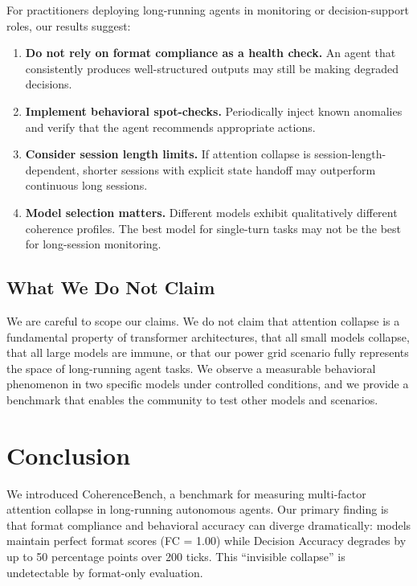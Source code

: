 \documentclass{article}
\begin{document}
For practitioners deploying long-running agents in monitoring or
decision-support roles, our results suggest:

\begin{enumerate}
    \item \textbf{Do not rely on format compliance as a health check.}
    An agent that consistently produces well-structured outputs may
    still be making degraded decisions.
    \item \textbf{Implement behavioral spot-checks.} Periodically inject
    known anomalies and verify that the agent recommends appropriate
    actions.
    \item \textbf{Consider session length limits.} If attention collapse
    is session-length-dependent, shorter sessions with explicit state
    handoff may outperform continuous long sessions.
    \item \textbf{Model selection matters.} Different models exhibit
    qualitatively different coherence profiles. The best model for
    single-turn tasks may not be the best for long-session monitoring.
\end{enumerate}

\subsection{What We Do Not Claim}

We are careful to scope our claims. We do not claim that attention
collapse is a fundamental property of transformer architectures, that
all small models collapse, that all large models are immune, or that our
power grid scenario fully represents the space of long-running agent
tasks. We observe a measurable behavioral phenomenon in two specific
models under controlled conditions, and we provide a benchmark that
enables the community to test other models and scenarios.

\section{Conclusion}
\label{sec:conclusion}

We introduced CoherenceBench, a benchmark for measuring multi-factor
attention collapse in long-running autonomous agents. Our primary finding
is that format compliance and behavioral accuracy can diverge
dramatically: models maintain perfect format scores (FC = 1.00) while
Decision Accuracy degrades by up to 50 percentage points over 200 ticks.
This ``invisible collapse'' is undetectable by format-only evaluation.
\end{document}
